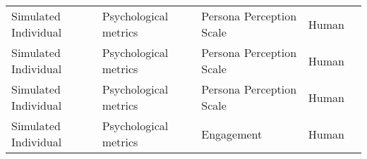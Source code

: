 \begin{small}
\begin{center}
\begin{longtable}{@{}p{}p{}p{}p{}p{}@{}}
Simulated Individual     & Psychological metrics & Persona Perception Scale                                                                                                                                                                                    & Human     & \cite{10.1145/3643834.3660729}                                                                                                                                                                                                                                                                                                                                                                                \\
Simulated Individual     & Psychological metrics & Persona Perception Scale                                                                                                                                                                                    & Human     & \cite{Ha2024CloChatUH}                                                                                                                                                                                                                                                                                                                                                                                \\
Simulated Individual     & Psychological metrics & Persona Perception Scale                                                                                                                                                                                    & Human     & \cite{10.1145/3613904.3642363}                                                                                                                                                                                                                                                                                                                                                                                    \\
Simulated Individual     & Psychological metrics & Engagement                                                                                                                                                                                                  & Human     & \cite{Zhang2024SpeechAgentsHS}                                                                                                                                                                                                                                                                                                                                                                                                   \\

\end{longtable}
\end{center}
\end{small}
